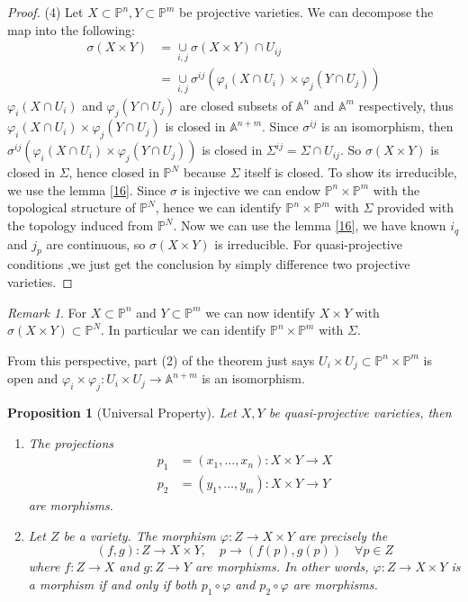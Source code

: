 \documentclass{amsart}
\theoremstyle{plain}
\newtheorem{proposition}{Proposition}
\theoremstyle{definition}
\theoremstyle{remark}
\newtheorem*{remark}{Remark}
\numberwithin{equation}{section}
\begin{document}
\begin{proof}
	(4) Let $ X\subset \mathbb{P}^n,Y\subset \mathbb{P}^m $ be projective varieties. We can decompose the map into the following:
	$$\begin{array}{cc}
	\sigma(X\times Y) &=\mathop{\cup}\limits_{i,j}\sigma(X\times Y)\cap U_{ij}\\
	&=\mathop{\cup}\limits_{i,j}\sigma^{ij}(\varphi_i(X\cap{U_i})\times \varphi_j(Y\cap{U_j}))
	\end{array}$$
	$ \varphi_i(X\cap U_i) $ and $ \varphi_j(Y\cap U_j) $ are closed subsets of $ \mathbb{A}^n $ and $ \mathbb{A}^m $ respectively, thus $ \varphi_i(X\cap{U_i})\times \varphi_j(Y\cap{U_j}) $ is closed in $ \mathbb{A}^{n+m} $. Since $ \sigma^{ij} $ is an isomorphism, then  $ \sigma^{ij}(\varphi_i(X\cap{U_i})\times \varphi_j(Y\cap{U_j})) $ is closed in $ \Sigma^{ij}=\Sigma\cap U_{ij}$. So $ \sigma(X\times Y) $ is closed in $ \Sigma $, hence closed in $ \mathbb{P}^N $ because $ \Sigma $ itself is closed. To show its irreducible, we use the lemma \ref{16}. Since $ \sigma $ is injective we can endow $ \mathbb{P}^n\times\mathbb{P}^m $ with the topological structure of $ \mathbb{P}^N $, hence we can identify $ \mathbb{P}^n\times\mathbb{P}^m $ with $ \Sigma $ provided with the topology induced from $ \mathbb{P}^N $. Now we can use the lemma \ref{16}, we have known $ i_q $ and $ j_p $ are continuous, so $ \sigma(X\times Y) $ is irreducible. For quasi-projective conditions ,we just get the conclusion by simply difference two projective varieties.
\end{proof}
\begin{remark}
	For $ X\subset \mathbb{P}^n $ and $ Y\subset\mathbb{P}^m $ we can now identify $ X\times Y $ with $ \sigma(X\times Y)\subset \mathbb{P}^N$. In particular we can identify $ \mathbb{P}^n\times\mathbb{P}^m $ with $ \Sigma $.
	
	From this perspective, part (2) of the theorem just says $ U_i\times U_j\subset \mathbb{P}^n\times \mathbb{P}^m $ is open and $ \varphi_i\times \varphi_j:U_i\times U_j\to \mathbb{A}^{n+m} $ is an isomorphism.
\end{remark}
\begin{proposition}[Universal Property]
	Let $ X,Y $ be quasi-projective varieties, then
	\begin{enumerate}
		\item The projections
		$$\begin{array}{cc}
		p_1 & =(x_1,\dots,x_n): X\times Y\to X\\
		p_2 & =(y_1,\dots,y_m): X\times Y\to Y
		\end{array}$$
		are morphisms.
		\item Let $ Z $ be a variety. The morphism $ \varphi : Z\to X \times Y $ are precisely the
		$$
		(f,g):Z\to X\times Y,\quad p\to (f(p),g(p))\quad\forall p\in Z
		$$
		where $ f:Z\to X $ and $ g:Z\to Y $ are morphisms. In other words, $ \varphi:Z\to X\times Y $ is a morphism if and only if both $ p_1\circ \varphi $ and $ p_2\circ\varphi  $ are morphisms.
	\end{enumerate}
\end{proposition}
\end{document}
